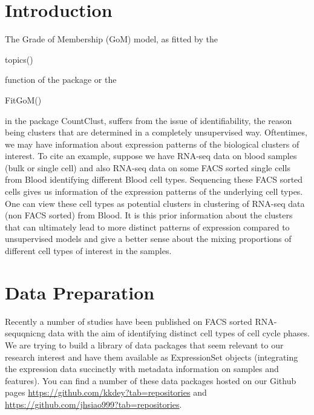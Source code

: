 \documentclass[12pt]{article}
\author{Kushal K Dey, Chiaowen Joyce Hsiao \& Matthew Stephens \\[1em] \small{\textit{Stephens Lab}, The University of Chicago} \mbox{ }\\ \small{\texttt{$^*$Correspondending Email: mstephens@uchicago.edu}}}
\begin{document}
\maketitle



\newpage

\tableofcontents

\section{Introduction}

The Grade of Membership (GoM) model, as fitted by the \begin{verb} topics() \end{verb} function of the package  or the \begin{verb} FitGoM() \end{verb} in the package CountClust, suffers from the issue of identifiability, the reason being clusters that are determined in a completely unsupervised way. Oftentimes, we may have information about expression patterns of the biological clusters of interest. To cite an example, suppose we have RNA-seq data on blood samples (bulk or single cell) and also RNA-seq data on some FACS sorted single cells from Blood identifying different Blood cell types. Sequencing these FACS sorted cells gives us information of the expression patterns of the underlying cell types. One can view these cell types as potential clusters in clustering of RNA-seq data (non FACS sorted) from Blood. It is this prior information about the clusters that can ultimately lead to more distinct patterns of expression compared to unsupervised models and give a better sense about the mixing proportions of different cell types of interest in the samples.

\section{Data Preparation}

Recently a number of studies have been published on FACS sorted RNA-sequqnicng data with the aim of identifying distinct cell types of cell cycle phases. We are trying to build a library of data packages that seem relevant to our research interest and have them available as ExpressionSet objects (integrating the expression data succinctly with metadata information on samples and features). You can find a number of these data packages hosted on our Github pages \url{https://github.com/kkdey?tab=repositories} and \url{https://github.com/jhsiao999?tab=repositories}.
\end{document}
